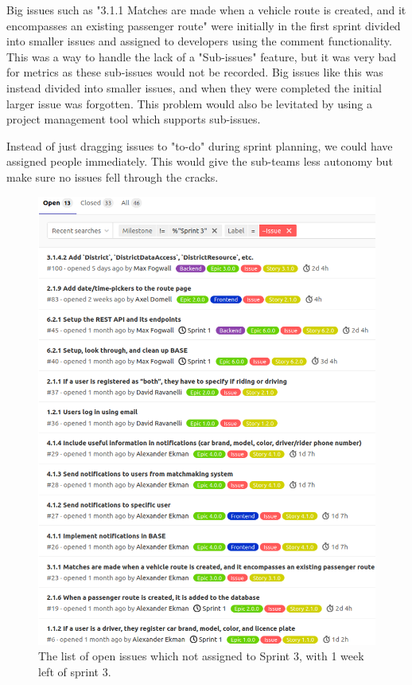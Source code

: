 \documentclass{article}
\begin{document}
Big issues such as "3.1.1 Matches are made when a vehicle route is created, and it encompasses an existing passenger route" were initially in the first sprint divided into smaller issues and assigned to developers using the comment functionality. This was a way to handle the lack of a "Sub-issues" feature, but it was very bad for metrics as these sub-issues would not be recorded. Big issues like this was instead divided into smaller issues, and when they were completed the initial larger issue was forgotten. This problem would also be levitated by using a project management tool which supports sub-issues.

Instead of just dragging issues to "to-do" during sprint planning, we could have assigned people immediately. This would give the sub-teams less autonomy but make sure no issues fell through the cracks. 

\begin{figure}[H]
    \centering
    \includegraphics[scale=0.6]{pfrFigures/forgotten_issues.png}
    \caption{The list of open issues which not assigned to Sprint 3, with 1 week left of sprint 3.}
    \label{fig:forgotten_issues}
\end{figure}
\end{document}
